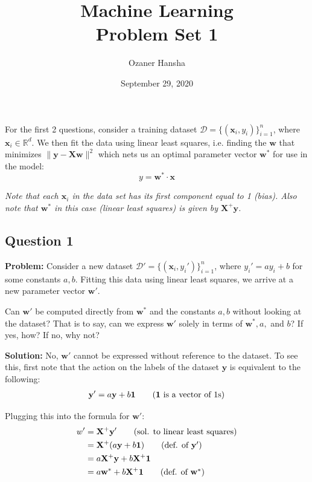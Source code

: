 \documentclass{article}
\renewcommand{\vec}[1]{\mathbf{#1}}
\newcommand{\mat}[1]{\mathbf{#1}}
\begin{document}
\title{Machine Learning\\ Problem Set 1}
\author{Ozaner Hansha}
\date{September 29, 2020}
\maketitle

For the first 2 questions, consider a training dataset $\mathcal D=\{(\vec x_i,y_i)\}^n_{i=1}$, where $\vec x_i\in\mathbb R^d$. We then fit the data using linear least squares, i.e. finding the $\vec w$ that minimizes $\|\vec y-\mat X\vec w\|^2$ which nets us an optimal parameter vector $\vec w^*$ for use in the model:
$$y=\vec w^*\cdot\vec x$$

\textit{Note that each $\vec x_i$ in the data set has its first component equal to 1 (bias). Also note that $\vec w^*$ in this case (linear least squares) is given by $\mat X^+\vec y$.}

\subsection*{Question 1}
\noindent\textbf{Problem:} Consider a new dataset $\mathcal D'=\{(\vec x_i,y_i')\}^n_{i=1}$, where $y_i'=ay_i+b$ for some constants $a,b$. Fitting this data using linear least squares, we arrive at a new parameter vector $\vec w'$.

Can $\vec w'$ be computed directly from $\vec w^*$ and the constants $a,b$ without looking at the dataset? That is to say, can we express $\vec w'$ solely in terms of $\vec w^*, a,$ and $b$? If yes, how? If no, why not?
\bigskip

\noindent\textbf{Solution:} No, $\vec w'$ cannot be expressed without reference to the dataset. To see this, first note that the action on the labels of the dataset $\vec y$ is equivalent to the following:
\begin{align*}
    \vec y'=a\vec y+b\vec 1\tag{$\vec 1$ is a vector of 1s}
\end{align*}

Plugging this into the formula for $\vec w'$:
\begin{align*}
    w'&=\mat X^+\vec y'\tag{sol. to linear least squares}\\
    &=\mat X^+(a\vec y+b\vec 1)\tag{def. of $\vec y'$}\\
    &=a\mat X^+\vec y+b\mat X^+\vec 1\\
    &=a\vec w^*+b\mat X^+\vec 1\tag{def. of $\vec w^*$}
\end{align*}
\end{document}
